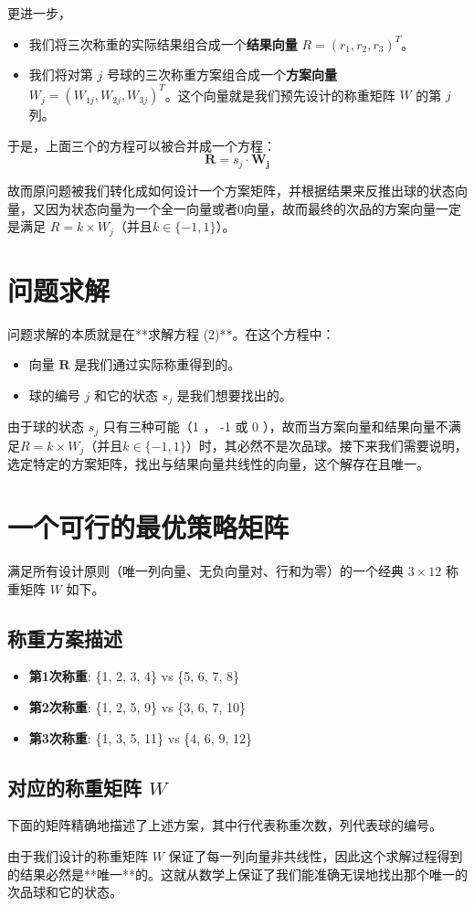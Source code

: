 \documentclass[12pt, a4paper]{ctexart}
\begin{document}
更进一步，
\begin{itemize}
    \item 我们将三次称重的实际结果组合成一个\textbf{结果向量} $R = (r_1, r_2, r_3)^T$。
    \item 我们将对第 $j$ 号球的三次称重方案组合成一个\textbf{方案向量} $W_j = (W_{1j}, W_{2j}, W_{3j})^T$。这个向量就是我们预先设计的称重矩阵 $W$ 的第 $j$ 列。
\end{itemize}
于是，上面三个的方程可以被合并成一个方程：
\begin{equation}
    \mathbf{R} = s_j \cdot \mathbf{W_j}
\end{equation}

故而原问题被我们转化成如何设计一个方案矩阵，并根据结果来反推出球的状态向量，又因为状态向量为一个全一向量或者0向量，故而最终的次品的方案向量一定是满足
$R = k \times W_j$（并且$k \in \{-1, 1\}$）。
\section{问题求解}

问题求解的本质就是在**求解方程 (2)**。在这个方程中：
\begin{itemize}
    \item 向量 $\mathbf{R}$ 是我们通过实际称重得到的。
    \item 球的编号 $j$ 和它的状态 $s_j$ 是我们想要找出的。
\end{itemize}
由于球的状态 $s_j$ 只有三种可能（1 ， -1 或 0 ），故而当方案向量和结果向量不满足$R = k \times W_j$（并且$k \in \{-1, 1\}$）时，其必然不是次品球。接下来我们需要说明，选定特定的方案矩阵，找出与结果向量共线性的向量，这个解存在且唯一。



\section*{一个可行的最优策略矩阵}

满足所有设计原则（唯一列向量、无负向量对、行和为零）的一个经典 $3 \times 12$ 称重矩阵 $W$ 如下。

\subsection*{称重方案描述}
\begin{itemize}
    \item \textbf{第1次称重}: \{1, 2, 3, 4\} vs \{5, 6, 7, 8\}
    \item \textbf{第2次称重}: \{1, 2, 5, 9\} vs \{3, 6, 7, 10\}
    \item \textbf{第3次称重}: \{1, 3, 5, 11\} vs \{4, 6, 9, 12\}
\end{itemize}

\subsection*{对应的称重矩阵 $W$}
下面的矩阵精确地描述了上述方案，其中行代表称重次数，列代表球的编号。


由于我们设计的称重矩阵 $W$ 保证了每一列向量非共线性，因此这个求解过程得到的结果必然是**唯一**的。这就从数学上保证了我们能准确无误地找出那个唯一的次品球和它的状态。
\end{document}
